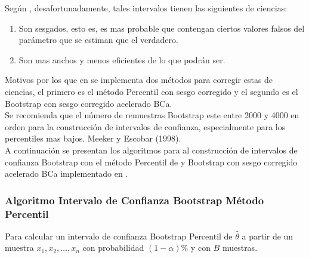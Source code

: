 Según \textcite{balam-2012}, desafortunadamente, tales intervalos tienen las siguientes de ciencias:\\

\begin{enumerate}
\item Son sesgados, esto es, es mas probable que contengan ciertos valores falsos del parámetro que se estiman que el verdadero.

\item Son mas anchos y menos eficientes de lo que podrán ser.
\end{enumerate}

Motivos por los que en \textcite{balam-2012} se implementa dos métodos para corregir estas de ciencias, el primero es el método Percentil con sesgo corregido y el segundo es el Bootstrap con sesgo corregido acelerado BCa.\\

Se recomienda que el número de remuestras Bootstrap este entre 2000 y 4000 en orden para la construcción de intervalos de confianza, especialmente para los percentiles mas bajos. Meeker y Escobar (1998).\\

A continuación se presentan los algoritmos para al construcción de intervalos de confianza Bootstrap con el método Percentil de \textcite{efron-1982} y Bootstrap con sesgo corregido acelerado BCa implementado en \textcite{balam-2012}.\\

\subsubsection{Algoritmo Intervalo de Confianza Bootstrap Método Percentil}

Para calcular un intervalo de confianza Bootstrap Percentil de $\hat{\theta}$ a partir de un muestra $x_{1}, x_{2}, \dots, x_{n}$ con probabilidad $(1-\alpha)$\% y con $B$ muestras.


